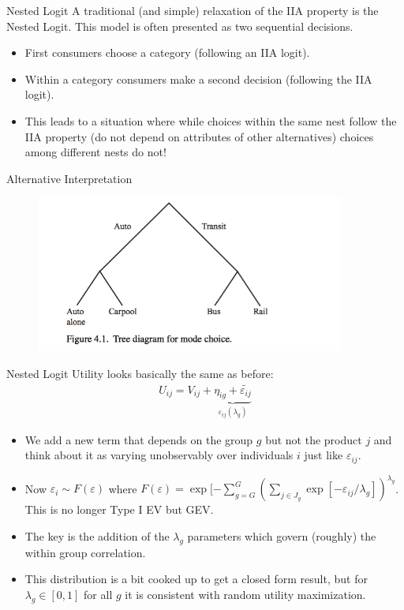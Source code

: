 \documentclass[xcolor=pdftex,dvipsnames,table,mathserif]{beamer}
\begin{document}
\begin{frame}{Nested Logit}
A traditional (and simple) relaxation of the IIA property is the Nested Logit. This model is often presented as two sequential decisions.
\begin{itemize}
\item First consumers choose a category (following an IIA logit).
\item Within a category consumers make a second decision (following the IIA logit).
\item This leads to a situation where while choices within the same nest follow the IIA property (do not depend on attributes of other alternatives) choices among different nests do not!
\end{itemize}
\end{frame}

\begin{frame}{Alternative Interpretation}
\begin{figure}[htbp]
\begin{center}
\includegraphics[width=4in]{nesting.png}
\end{center}
\end{figure}
\end{frame}

\begin{frame}{Nested Logit}
Utility looks basically the same as before:
\begin{eqnarray*}
U_{ij} = V_{ij} + \underbrace{\eta_{ig} + \widetilde{\varepsilon_{ij}}}_{\varepsilon_{ij}(\lambda_g)}
\end{eqnarray*}
\begin{itemize}
\item We add a new term that depends on the group $g$ but not the product $j$ and think about it as varying unobservably over individuals $i$ just like $\varepsilon_{ij}$.
\item Now $\varepsilon_i \sim F(\varepsilon)$ where $F(\varepsilon) = \exp[-\sum_{g=G}^G \left(\sum_{j \in J_g} \exp[-\varepsilon_{ij}/\lambda_g]\right)^{\lambda_g}$. This is no longer Type I EV but GEV.
\item The key is the addition of the $\lambda_g$ parameters which govern (roughly) the within group correlation.
\item This distribution is a bit cooked up to get a closed form result, but for $\lambda_g \in [0,1]$ for all $g$ it is consistent with random utility maximization.
\end{itemize}
\end{frame}
\end{document}
